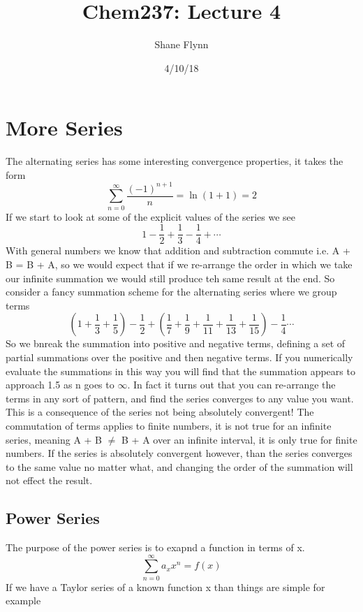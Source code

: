 \documentclass{article}
\title{Chem237: Lecture 4}
\date{4/10/18}
\author{Shane Flynn}
\newcommand{\be}{\begin{equation}}
\newcommand{\ee}{\end{equation}}
\newcommand{\sums}{\sum_{n=0}^\infty}
\begin{document}
\maketitle
\section*{More Series}
The alternating series has some interesting convergence properties, it takes the form
\be
\sums \frac{(-1)^{n+1}}{n} = \ln (1+1) = 2
\ee
If we start to look at some of the explicit values of the series we see 
\be
1 - \frac{1}{2} + \frac{1}{3} - \frac{1}{4} + \cdots
\ee
With general numbers we know that addition and subtraction commute i.e. A + B = B + A, so we would expect that if we re-arrange the order in which we take our infinite summation we would still produce teh same result at the end. 
So consider a fancy summation scheme for the alternating series where we group terms
\be
\left(1 + \frac{1}{3} + \frac{1}{5}\right) - \frac{1}{2} + \left(\frac{1}{7} + \frac{1}{9} + \frac{1}{11} + \frac{1}{13} + \frac{1}{15}\right) - \frac{1}{4} \cdots
\ee
So we bnreak the summation into positive and negative terms, defining a set of partial summations over the positive and then negative terms. 
If you numerically evaluate the summations in this way you will find that the summation appears to approach 1.5 as n goes to $\infty$.
In fact it turns out that you can re-arrange the terms in any sort of pattern, and find the series converges to any value you want. 
This is a consequence of the series not being absolutely convergent!
The commutation of terms applies to finite numbers, it is not true for an infinite series, meaning A + B $\neq$ B + A over an infinite interval, it is only true for finite numbers. 
If the series is absolutely convergent however, than the series converges to the same value no matter what, and changing the order of the summation will not effect the result. 

\subsection*{Power Series}
The purpose of the power series is to exapnd a function in terms of x. 
\be
\sums a_x x^n = f(x) 
\ee
If we have a Taylor series of a known function x than things are simple for example
\end{document}
